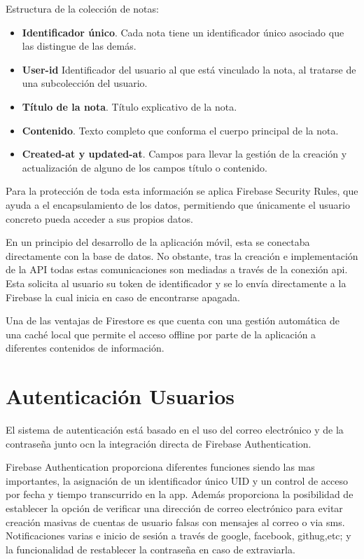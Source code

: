 Estructura de la colección de notas:
\begin{itemize}
    \item \textbf{Identificador único}. Cada nota tiene un identificador único asociado que las distingue de las demás.
    \item \textbf{User-id} Identificador del usuario al que está vinculado la nota, al tratarse de una subcolección del usuario.
    \item \textbf{Título de la nota}. Título explicativo de la nota.
    \item \textbf{Contenido}. Texto completo que conforma el cuerpo principal de la nota.
    \item \textbf{Created-at y updated-at}. Campos para llevar la gestión de la creación y actualización de alguno de los campos título o contenido.
\end{itemize}

Para la protección de toda esta información se aplica Firebase Security Rules, que ayuda a el encapsulamiento de los datos, permitiendo que únicamente el usuario concreto pueda acceder a sus propios datos.

En un principio del desarrollo de la aplicación móvil, esta se conectaba directamente con la base de datos. No obstante, tras la creación e implementación de la API todas estas comunicaciones son mediadas a través de la conexión api. Esta solicita al usuario su token de identificador y se lo envía directamente a la Firebase la cual inicia en caso de encontrarse apagada.

Una de las ventajas de Firestore es que cuenta con una gestión automática de una caché local que permite el acceso offline por parte de la aplicación a diferentes contenidos de información.

\section{Autenticación Usuarios}

El sistema de autenticación está basado en el uso del correo electrónico y de la contraseña junto ocn la integración directa de Firebase Authentication.

Firebase Authentication proporciona diferentes funciones siendo las mas importantes, la asignación de un identificador único UID y un control de acceso por fecha y tiempo transcurrido en la app. Además proporciona la posibilidad de establecer la opción de verificar una dirección de correo electrónico para evitar creación masivas de cuentas de usuario falsas con mensajes al correo o via sms. Notificaciones varias e inicio de sesión a través de google, facebook, githug,etc;  y la funcionalidad de restablecer la contraseña en caso de extraviarla.

